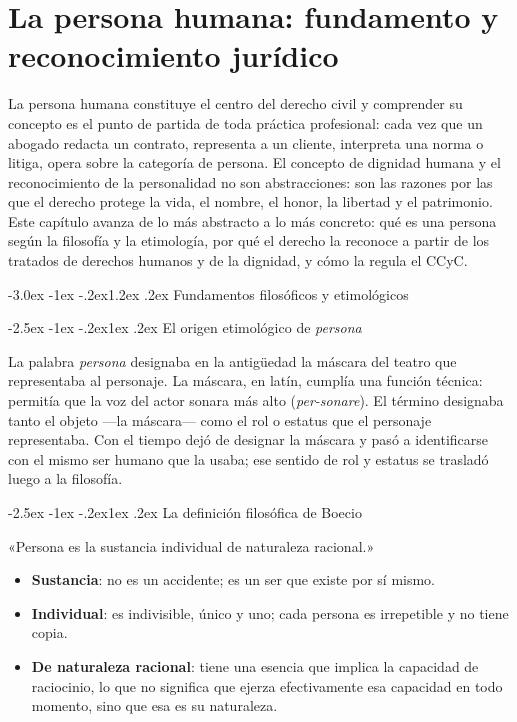 \documentclass[12pt,oneside]{book}
\makeatletter
\renewcommand\section{\@startsection{section}{1}{\z@}%
  {-3.0ex \@plus -1ex \@minus -.2ex}{1.2ex \@plus .2ex}%
  {\normalfont\large\bfseries\color{acento}}}
\renewcommand\subsection{\@startsection{subsection}{2}{\z@}%
  {-2.5ex \@plus -1ex \@minus -.2ex}{1ex \@plus .2ex}%
  {\normalfont\normalsize\bfseries}}
\makeatother
\begin{document}
\chapter{La persona humana: fundamento y reconocimiento jurídico}
\label{cap:persona}

La persona humana constituye el centro del derecho civil y comprender su concepto es el punto de partida de toda práctica profesional: cada vez que un abogado redacta un contrato, representa a un cliente, interpreta una norma o litiga, opera sobre la categoría de persona. El concepto de dignidad humana y el reconocimiento de la personalidad no son abstracciones: son las razones por las que el derecho protege la vida, el nombre, el honor, la libertad y el patrimonio. Este capítulo avanza de lo más abstracto a lo más concreto: qué es una persona según la filosofía y la etimología, por qué el derecho la reconoce a partir de los tratados de derechos humanos y de la dignidad, y cómo la regula el CCyC.

\section{Fundamentos filosóficos y etimológicos}

\subsection{El origen etimológico de \emph{persona}}

La palabra \emph{persona} designaba en la antigüedad la máscara del teatro que representaba al personaje. La máscara, en latín, cumplía una función técnica: permitía que la voz del actor sonara más alto (\emph{per-sonare}). El término designaba tanto el objeto ---la máscara--- como el rol o estatus que el personaje representaba. Con el tiempo dejó de designar la máscara y pasó a identificarse con el mismo ser humano que la usaba; ese sentido de rol y estatus se trasladó luego a la filosofía.

\subsection{La definición filosófica de Boecio}

\begin{definicion}
«Persona es la sustancia individual de naturaleza racional.»
\begin{itemize}
\item \textbf{Sustancia}: no es un accidente; es un ser que existe por sí mismo.
\item \textbf{Individual}: es indivisible, único y uno; cada persona es irrepetible y no tiene copia.
\item \textbf{De naturaleza racional}: tiene una esencia que implica la capacidad de raciocinio, lo que no significa que ejerza efectivamente esa capacidad en todo momento, sino que esa es su naturaleza.
\end{itemize}
\end{definicion}
\end{document}
